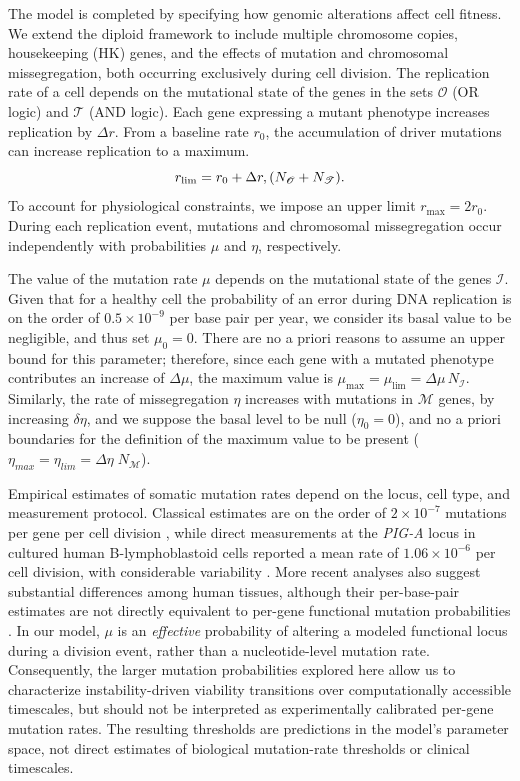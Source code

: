 \documentclass[10pt, aps, rmp,  twocolumn, superscriptaddress, floatfix, showkeys]{revtex4-2}
\begin{document}
The model is completed by specifying how genomic alterations affect cell fitness. We extend the diploid framework to include multiple chromosome copies, housekeeping (HK) genes, and the effects of mutation and chromosomal missegregation, both occurring exclusively during cell division.
 The replication rate of a cell depends on the mutational state of the genes in the sets $\mathcal{O}$ (OR logic) and $\mathcal{T}$ (AND logic). Each gene expressing a mutant phenotype increases replication by $\Delta r$. From a baseline rate $r_0$, the accumulation of driver mutations can increase replication to a maximum.
\begin{equation}
r_{\rm lim}=r_0+\Delta r,(N_{\mathcal{O}}+N_{\mathcal{T}}).
\end{equation}
To account for physiological constraints, we impose an upper limit $r_{\max}=2r_0$.
During each replication event, mutations and chromosomal missegregation occur 
independently with probabilities $\mu$ and $\eta$, respectively.

The value of the mutation rate $\mu$ depends on the mutational state of the genes $\mathcal{I}$. Given that for a healthy cell the probability of an error during DNA replication is on the order of $0.5 \times 10^{-9}$ per base pair per year, we consider its basal value to be negligible, and thus set $\mu_0 = 0$. There are no a priori reasons to assume an upper bound for this parameter; therefore, since each gene with a mutated phenotype contributes an increase of $\Delta \mu$, the maximum value is $\mu_{\max} = \mu_{\lim} = \Delta \mu \, N_{\mathcal{I}}$. Similarly, the rate of missegregation $\eta$ increases with mutations in $\mathcal{M}$ genes, by increasing $\delta \eta$, and we suppose the basal level to be null ($\eta_0=0$), and no a priori boundaries for the definition of the maximum value to be present ($\eta_{max} = \eta_{lim} =\Delta \eta \; N_{\mathcal{M}}$). 

Empirical estimates of somatic mutation rates depend on the locus, cell type, and measurement protocol. Classical estimates are on the order of $2\times10^{-7}$ mutations per gene per cell division \citep{JacksonLoeb1998}, while direct measurements at the \textit{PIG-A} locus in cultured human B-lymphoblastoid cells reported a mean rate of $1.06\times10^{-6}$ per cell division, with considerable variability \citep{Araten2005}. More recent analyses also suggest substantial differences among human tissues, although their per-base-pair estimates are not directly equivalent to per-gene functional mutation probabilities \citep{WernerSottoriva2018}. In our model, $\mu$ is an \emph{effective} probability of altering a modeled functional locus during a division event, rather than a nucleotide-level mutation rate. Consequently, the larger mutation probabilities explored here allow us to characterize instability-driven viability transitions over computationally accessible timescales, but should not be interpreted as experimentally calibrated per-gene mutation rates. The resulting thresholds are predictions in the model's parameter space, not direct estimates of biological mutation-rate thresholds or clinical timescales.
\end{document}
